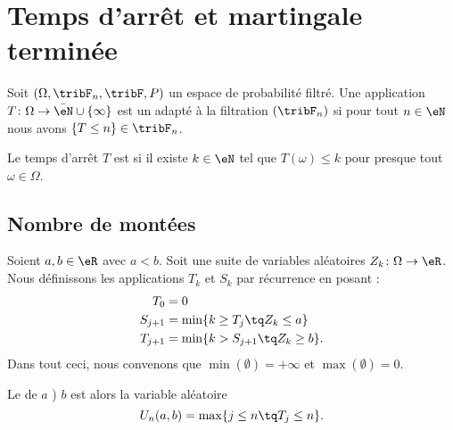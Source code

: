 \section{Temps d'arrêt et martingale terminée}

\begin{definition}		\label{DEFooJBYJooKYVAJG}
	Soit \( (\Omega,\tribF_n,\tribF,P)\) un espace de probabilité filtré. Une application \( T\colon \Omega\to \bar \eN\cup\{ \infty \}\) est un  adapté à la filtration \( (\tribF_n)\) si pour tout \( n\in \eN\) nous avons \( \{ T\leq n \}\in\tribF_n\).

	Le temps d'arrêt \( T\) est  si il existe \( k\in \eN\) tel que \( T(\omega)\leq k\) pour presque tout \( \omega\in \Omega\).
\end{definition}


\subsection{Nombre de montées}

\begin{definition}	\label{DEFooIUOXooPfASWz}
	Soient \( a,b\in \eR\) avec \( a<b\). Soit une suite de variables aléatoires \(Z_k \colon \Omega\to \eR  \). Nous définissons les applications \( T_k\) et \( S_k\) par récurrence en posant :
	\begin{subequations}		\label{EQooVQSIooHGAWau}
		\begin{align}
			T_0     & =0                                  \\
			S_{j+1} & =\min\{ k\geq T_j\tq Z_k\leq a \}   \\
			T_{j+1} & =\min\{ k> S_{j+1}\tq Z_k\geq b \}.
		\end{align}
	\end{subequations}
	Dans tout ceci, nous convenons que \( \min(\emptyset)=+\infty\) et \( \max(\emptyset)=0\).

	Le  de \( a\) ) \( b\) est alors la variable aléatoire
	\begin{equation}
		U_n(a,b)=\max\{ j\leq n\tq T_j\leq n \}.
	\end{equation}
\end{definition}

